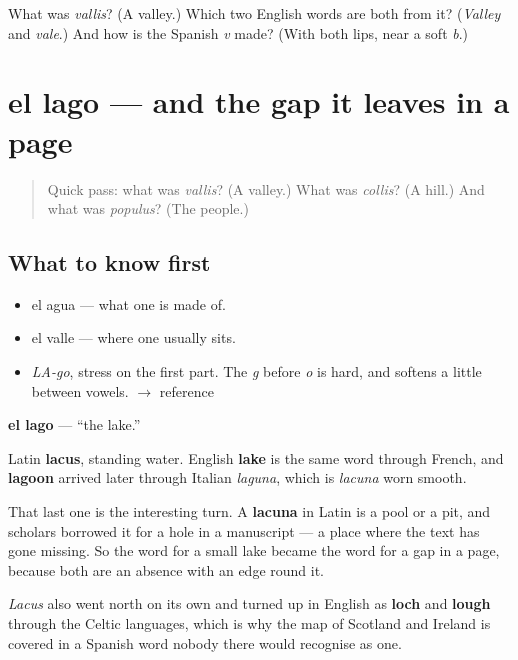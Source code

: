 \begin{tcolorbox}[breakable,colback=teal!4,colframe=teal!35!black,title={Before you move on}]
What was \emph{vallis}? (A valley.) Which two English words are both from it? (\emph{Valley} and \emph{vale}.) And how is the Spanish \emph{v} made? (With both lips, near a soft \emph{b}.)
\end{tcolorbox}
\section[el lago]{el lago — and the gap it leaves in a page}

\label{lesson:ES-C292-lago}



\begin{quote}
Quick pass: what was \emph{vallis}? (A valley.) What was \emph{collis}? (A hill.) And what was \emph{populus}? (The people.)
\end{quote}

\subsection*{What to know first}
\begin{itemize}
\raggedright
  \item el agua — what one is made of.
  \item el valle — where one usually sits.
\end{itemize}

\begin{sounds}
\begin{itemize}
\raggedright
  \item \emph{LA-go}, stress on the first part. The \emph{g} before \emph{o} is hard, and softens a little between vowels. $\to$ reference
\end{itemize}
\end{sounds}

\begin{cousinweb}
\textbf{el lago} — \textquotedblleft{}the lake.\textquotedblright{}

Latin \textbf{lacus}, standing water. English \textbf{lake} is the same word through French, and \textbf{lagoon} arrived later through Italian \emph{laguna}, which is \emph{lacuna} worn smooth.

That last one is the interesting turn. A \textbf{lacuna} in Latin is a pool or a pit, and scholars borrowed it for a hole in a manuscript — a place where the text has gone missing. So the word for a small lake became the word for a gap in a page, because both are an absence with an edge round it.

\emph{Lacus} also went north on its own and turned up in English as \textbf{loch} and \textbf{lough} through the Celtic languages, which is why the map of Scotland and Ireland is covered in a Spanish word nobody there would recognise as one.
\end{cousinweb}

